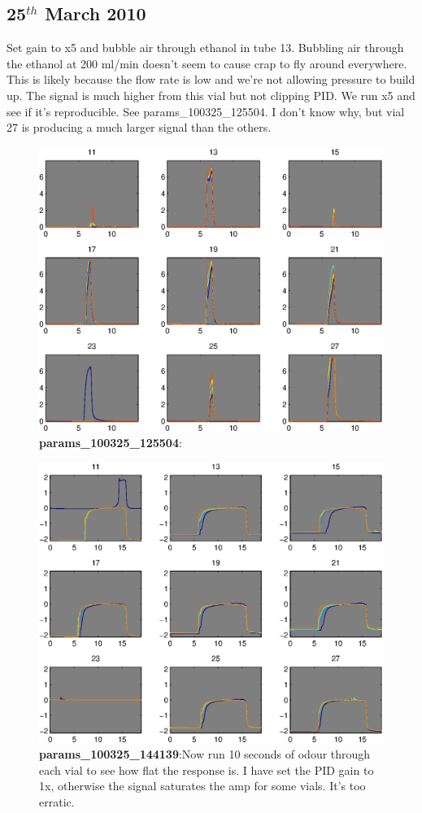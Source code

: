 \documentclass[a4paper]{report}
\begin{document}
\clearpage
\subsection{25$^{th}$ March 2010}
Set gain to x5 and bubble air through ethanol in tube 13.  Bubbling
air through the ethanol at 200 ml/min doesn't seem to cause crap to
fly around everywhere. This is likely because the flow rate is low and
we're not allowing pressure to build up. The signal is much higher
from this vial but not clipping PID. We run x5 and see if it's
reproducible. See params\_100325\_125504. I don't know why, but vial
27 is producing a much larger signal than the others.

\begin{figure}[h]
\centering \includegraphics[width=5in]{params_100325_125504.eps}
\caption{\textbf{params\_100325\_125504}:}
\end{figure}


\begin{figure}
\centering
\includegraphics[width=5in]{params_100325_144139.eps}
\caption{\textbf{params\_100325\_144139}:Now run 10 seconds of odour
  through each vial to see how flat the response is. I have set the
  PID gain to 1x, otherwise the signal saturates the amp for some
  vials.  It's too erratic. }
\end{figure}
\end{document}
